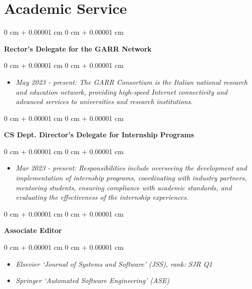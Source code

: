 \documentclass[10pt, a4paper]{article}
\newenvironment{highlights}{
    \begin{itemize}[
        topsep=0.10 cm,
        parsep=0.10 cm,
        partopsep=0pt,
        itemsep=0pt,
        leftmargin=0 cm + 10pt
    ]
}{
    \end{itemize}
} %
\newenvironment{onecolentry}{
    \begin{adjustwidth}{
        0 cm + 0.00001 cm
    }{
        0 cm + 0.00001 cm
    }
}{
    \end{adjustwidth}
} %
\begin{document}
    
    \section{Academic Service}



        
        \begin{onecolentry}
            \textbf{Rector’s Delegate for the GARR Network}\end{onecolentry}

        \vspace{0.10 cm}
        \begin{onecolentry}
            \begin{highlights}
                \item \textit{May 2023 - present: The GARR Consortium is the Italian national research and education network, providing high-speed Internet connectivity and advanced services to universities and research institutions.}
            \end{highlights}
        \end{onecolentry}


        \vspace{0.2 cm}

        \begin{onecolentry}
            \textbf{CS Dept. Director’s Delegate for Internship Programs}\end{onecolentry}

        \vspace{0.10 cm}
        \begin{onecolentry}
            \begin{highlights}
                \item \textit{Mar 2023 - present: Responsibilities include overseeing the development and implementation of internship programs, coordinating with industry partners, mentoring students, ensuring compliance with academic standards, and evaluating the effectiveness of the internship experiences.}
            \end{highlights}
        \end{onecolentry}


        \vspace{0.2 cm}

        \begin{onecolentry}
            \textbf{Associate Editor}\end{onecolentry}

        \vspace{0.10 cm}
        \begin{onecolentry}
            \begin{highlights}
                \item \textit{Elsevier `Journal of Systems and Software' (JSS), rank: SJR Q1}
                \item \textit{Springer `Automated Software Engineering' (ASE)}
            \end{highlights}
        \end{onecolentry}
\end{document}
